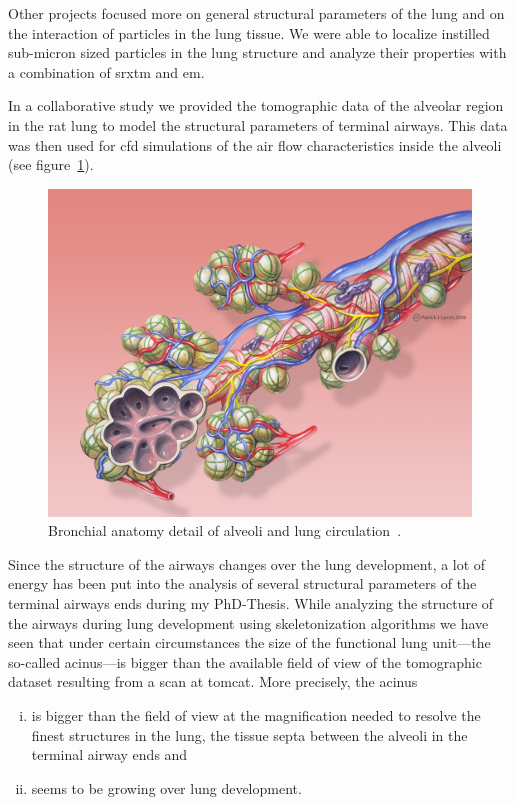 Other projects focused more on general structural parameters of the lung and on the  interaction of particles in the lung tissue. We were able to localize instilled sub-micron sized particles in the lung structure and analyze their properties with a combination of \ac{srxtm} and \ac{em}.

In a collaborative study we provided the tomographic data of the alveolar region in the rat lung to model the structural parameters of terminal airways. This data was then used for \ac{cfd} simulations of the air flow characteristics inside the alveoli (see figure~\ref{fig:alveoli}).

\renewcommand{\imsize}{0.618\linewidth}
\begin{figure}
	\centering%
	\includegraphics[width=\imsize]{img/Bronchial_anatomy}%
	\caption{Bronchial anatomy detail of alveoli and lung circulation~\cite{Alveoli}.}%
	\label{fig:alveoli}%
\end{figure}

Since the structure of the airways changes over the lung development, a lot of energy has been put into the analysis of several structural parameters of the terminal airways ends during my PhD-Thesis. While analyzing the structure of the airways during lung development using skeletonization algorithms we have seen that under certain circumstances the size of the functional lung unit---the so-called acinus---is bigger than the available field of view of the tomographic dataset resulting from a scan at \ac{tomcat}. More precisely, the acinus 
\begin{enumerate}[i)]
	\item is bigger than the field of view at the magnification needed to resolve the finest structures in the lung, the tissue septa between the alveoli in the terminal airway ends and
	\item seems to be growing over lung development.
\end{enumerate}

